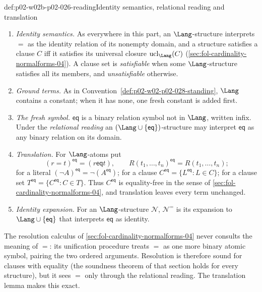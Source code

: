 \begin{hbconvention}{def:p02-w02b-p02-026-reading}{Identity semantics, relational reading and translation}
\begin{enumerate}
  \item \emph{Identity semantics.}  As everywhere in this part, an
        \(\Lang\)-structure interprets \(=\) as the identity relation of its
        nonempty domain, and a structure satisfies a clause \(C\) iff it
        satisfies its universal closure \(\operatorname{ucl}_{\Lang}(C)\)
        (\cref{sec:fol-cardinality-normalforms-04}).  A clause set is
        \emph{satisfiable} when some \(\Lang\)-structure satisfies all its
        members, and \emph{unsatisfiable} otherwise.
  \item \emph{Ground terms.}  As in
        Convention~\ref{def:p02-w02-p02-028-standing}, \(\Lang\) contains a
        constant; when it has none, one fresh constant is added first.
  \item \emph{The fresh symbol.}  \(\mathsf{eq}\) is a binary relation
        symbol not in \(\Lang\), written infix.  Under the \emph{relational
        reading} an \((\Lang\cup\{\mathsf{eq}\})\)-structure may interpret
        \(\mathsf{eq}\) as any binary relation on its domain.
  \item \emph{Translation.}  For \(\Lang\)-atoms put
        \[
         (r=t)^{\mathsf{eq}}=(r\mathrel{\mathsf{eq}}t),
         \qquad
         R(t_1,\ldots,t_n)^{\mathsf{eq}}=R(t_1,\ldots,t_n);
        \]
        for a literal
        \((\neg A)^{\mathsf{eq}}=\neg(A^{\mathsf{eq}})\); for a clause
        \(C^{\mathsf{eq}}=\{L^{\mathsf{eq}}:L\in C\}\); for a clause set
        \(T^{\mathsf{eq}}=\{C^{\mathsf{eq}}:C\in T\}\).  Thus
        \(C^{\mathsf{eq}}\) is equality-free in the sense of
        \cref{sec:fol-cardinality-normalforms-04}, and translation leaves
        every term unchanged.
  \item \emph{Identity expansion.}  For an \(\Lang\)-structure
        \(\mathcal N\), \(\mathcal N^{=}\) is its expansion to
        \(\Lang\cup\{\mathsf{eq}\}\) that interprets \(\mathsf{eq}\) as
        identity.
\end{enumerate}
\end{hbconvention}

The resolution calculus of \cref{sec:fol-cardinality-normalforms-04} never
consults the meaning of \(=\): its unification procedure treats \(=\) as one
more binary atomic symbol, pairing the two ordered arguments.  Resolution is
therefore sound for clauses with equality (the soundness theorem of that
section holds for every structure), but it sees \(=\) only through the
relational reading.  The translation lemma makes this exact.


